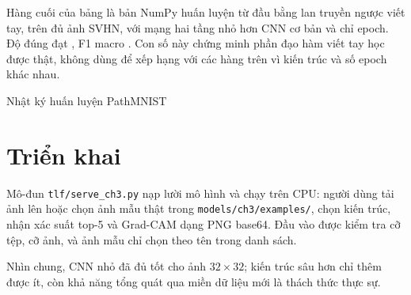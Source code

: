 Hàng cuối của bảng là bản NumPy huấn luyện từ đầu bằng lan truyền ngược viết tay, trên đủ  ảnh SVHN, với mạng hai tầng nhỏ hơn CNN cơ bản và chỉ  epoch. Độ đúng đạt , F1 macro . Con số này chứng minh phần đạo hàm viết tay học được thật, không dùng để xếp hạng với các hàng trên vì kiến trúc và số epoch khác nhau.

\begin{ketqua}{Nhật ký huấn luyện PathMNIST}

\end{ketqua}

\section{Triển khai}
Mô-đun \texttt{tlf/serve\_ch3.py} nạp lười mô hình và chạy trên CPU: người dùng tải ảnh lên hoặc chọn ảnh mẫu thật trong \texttt{models/ch3/examples/}, chọn kiến trúc, nhận xác suất top-5 và Grad-CAM dạng PNG base64. Đầu vào được kiểm tra cỡ tệp, cỡ ảnh, và ảnh mẫu chỉ chọn theo tên trong danh sách.


Nhìn chung, CNN nhỏ đã đủ tốt cho ảnh $32{\times}32$; kiến trúc sâu hơn chỉ thêm được ít, còn khả năng tổng quát qua miền dữ liệu mới là thách thức thực sự.
